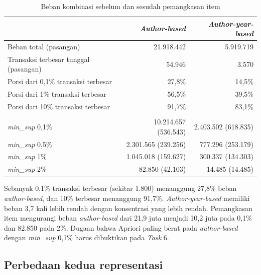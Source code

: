 \begin{table}[ht]
\caption{Beban kombinasi sebelum dan sesudah pemangkasan item}
\label{tab:beban}
\small
\begin{tabularx}{\textwidth}{@{}>{\raggedright\arraybackslash}X rr@{}}
\toprule
 & \textbf{\textit{Author-based}} & \textbf{\textit{Author-year-based}} \\
\midrule
Beban total (pasangan) & 21.918.442 & 5.919.719 \\
Transaksi terbesar tunggal (pasangan) & 54.946 & 3.570 \\
Porsi dari 0,1\% transaksi terbesar & 27,8\% & 14,5\% \\
Porsi dari 1\% transaksi terbesar & 56,5\% & 39,5\% \\
Porsi dari 10\% transaksi terbesar & 91,7\% & 83,1\% \\
\midrule
\multicolumn{3}{@{}l}{\textbf{Beban setelah pemangkasan (transaksi dengan minimal 2 item \textit{frequent})}} \\
\textit{min\_sup} 0,1\% & 10.214.657 (536.543) & 2.403.502 (618.835) \\
\textit{min\_sup} 0,5\% & 2.301.565 (239.256) & 777.296 (253.179) \\
\textit{min\_sup} 1\% & 1.045.018 (159.627) & 300.337 (134.303) \\
\textit{min\_sup} 2\% & 82.850 (42.103) & 14.485 (14.485) \\
\bottomrule
\end{tabularx}
\end{table}

Sebanyak 0,1\% transaksi terbesar (sekitar 1.800) menanggung 27,8\% beban \textit{author-based}, dan 10\% terbesar menanggung 91,7\%. \textit{Author-year-based} memiliki beban 3,7 kali lebih rendah dengan konsentrasi yang lebih rendah. Pemangkasan item mengurangi beban \textit{author-based} dari 21,9 juta menjadi 10,2 juta pada 0,1\% dan 82.850 pada 2\%. Dugaan bahwa Apriori paling berat pada \textit{author-based} dengan \textit{min\_sup} 0,1\% harus dibuktikan pada \textit{Task} 6.

\subsection{Perbedaan kedua representasi}
\label{sec:hasil-banding-repr}
